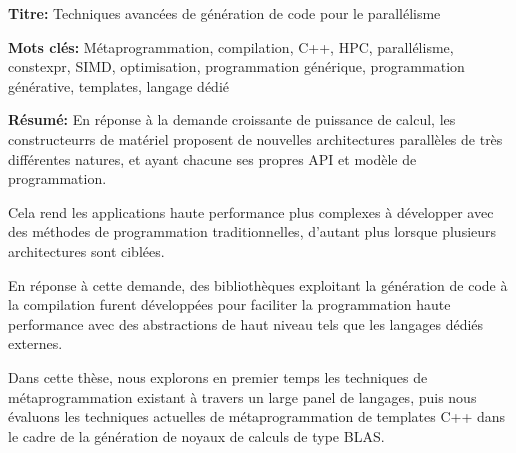 \documentclass[english,12pt,a4paper]{book}
\begin{document}
\begin{mdframed}[linecolor=Prune,linewidth=1]

\textbf{Titre:} Techniques avanc\'ees de g\'en\'eration de code pour le
parall\'elisme

\noindent \textbf{Mots clés:}
M\'etaprogrammation, compilation, C++, HPC, parall\'elisme, constexpr, SIMD,
optimisation, programmation g\'en\'erique, programmation g\'en\'erative,
templates, langage d\'edi\'e

\vspace{-.5cm}
\begin{multicols}{2}
\noindent \textbf{Résumé:}
En r\'eponse \`a la demande croissante de puissance de calcul,
les constructeurrs de mat\'eriel proposent de nouvelles architectures
parall\`eles de tr\`es diff\'erentes natures, et ayant chacune ses propres
API et mod\`ele de programmation.

Cela rend les applications haute performance plus complexes \`a d\'evelopper
avec des m\'ethodes de programmation traditionnelles, d'autant plus lorsque
plusieurs architectures sont cibl\'ees.

En r\'eponse \`a cette demande, des biblioth\`eques exploitant la
g\'en\'eration de code \`a la compilation furent d\'evelopp\'ees pour faciliter
la programmation haute performance avec des abstractions de haut niveau tels
que les langages d\'edi\'es externes.

Dans cette th\`ese, nous explorons en premier temps les techniques de
m\'etaprogrammation existant \`a travers un large panel de langages, puis nous
\'evaluons les techniques actuelles de m\'etaprogrammation de templates C++
dans le cadre de la g\'en\'eration de noyaux de calculs de type BLAS.


\end{multicols}
\end{mdframed}
\end{document}
